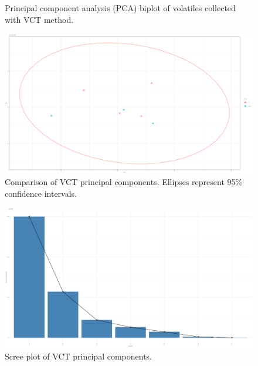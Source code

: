 \documentclass{ufdissertation}[overrideChapters] %
\begin{document}
{\begin{figure}
{}

\caption[Principal component analysis (PCA) biplot of volatiles collected with VCT]{Principal component analysis (PCA) biplot of volatiles collected with VCT method.}\label{fig:qsep-vocs}
\end{figure}
\begin{figure}

{\centering \includegraphics[width=1\linewidth]{figure/rrv_volatiles_comparison_pca_comp_qsep} 

}

\caption[Comparison of VCT principal components]{Comparison of VCT principal components. Ellipses represent 95\% confidence intervals.}\label{fig:qsep-vocs-compares}
\end{figure}
\begin{figure}

{\centering \includegraphics[width=1\linewidth]{figure/rrv_volatiles_screeplot_pca_qsep} 

}

\caption[Scree plot of VCT principal components]{Scree plot of VCT principal components.}\label{fig:qsep-vocs-scree}
\end{figure}
\begin{figure}


\end{figure}}
\end{document}
